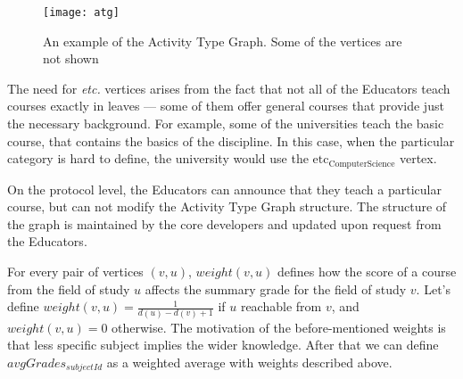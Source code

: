 \begin{figure}[ht]
\centering
\texttt{[image: atg]}
\caption{An example of the Activity Type Graph. Some of the vertices are not shown}
\label{fig:atg}
\end{figure}

The need for \textit{etc.} vertices arises from the fact that not all of the Educators teach courses exactly in leaves — some of them offer general courses that provide just the necessary background. For example, some of the universities teach the basic  course, that contains the basics of the discipline. In this case, when the particular category is hard to define, the university would use the $\textrm{etc}_{\textrm{ComputerScience}}$ vertex.

On the protocol level, the Educators can announce that they teach a particular course, but can not modify the Activity Type Graph structure. The structure of the graph is maintained by the core developers and updated upon request from the Educators.

For every pair of vertices $(v, u)$, $weight(v, u)$ defines how the score of a course from the field of study $u$ affects the summary grade for the field of study $v$. Let's define $weight(v, u) = \frac{1}{d(u) - d(v) + 1}$ if $u$ reachable from $v$, and $weight(v, u) = 0$ otherwise. The motivation of the before-mentioned weights is that less specific subject implies the wider knowledge. After that we can define $avgGrades_{subjectId}$ as a weighted average with weights described above.

